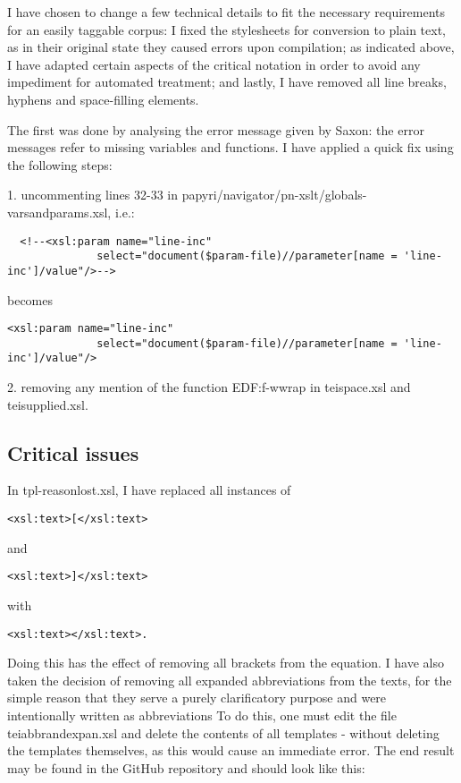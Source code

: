I have chosen to change a few technical details to fit the necessary
requirements for an easily taggable corpus: I fixed the stylesheets for
conversion to plain text, as in their original state they caused errors upon
compilation; as indicated above, I have adapted certain aspects of the critical
notation in order to avoid any impediment for automated treatment; and lastly,
I have removed all line breaks, hyphens and space-filling elements.

The first was done by analysing the error message given by Saxon: the
error messages refer to missing variables and functions. I have applied
a quick fix using the following steps:

1. uncommenting lines 32-33 in papyri/navigator/pn-xslt/globals-varsandparams.xsl, i.e.:

\begin{lstlisting}
  <!--<xsl:param name="line-inc"
              select="document($param-file)//parameter[name = 'line-inc']/value"/>-->
\end{lstlisting}
becomes
\begin{lstlisting}
<xsl:param name="line-inc"
              select="document($param-file)//parameter[name = 'line-inc']/value"/>
\end{lstlisting}

2. removing any mention of the function EDF:f-wwrap in teispace.xsl and
teisupplied.xsl.

\subsection{Critical issues}
\label{subsect:criticalissues}


In tpl-reasonlost.xsl, I have replaced all instances of
\begin{lstlisting}
<xsl:text>[</xsl:text> 
\end{lstlisting}
and 
\begin{lstlisting}
<xsl:text>]</xsl:text> 
\end{lstlisting}
with
\begin{lstlisting}
<xsl:text></xsl:text>.
\end{lstlisting}

Doing this has the effect of removing all brackets from the equation. I have
also taken the decision of removing all expanded abbreviations from the texts,
for the simple reason that they serve a purely clarificatory purpose and were
intentionally written as abbreviations  To do this, one must edit the file
teiabbrandexpan.xsl and delete the contents of all templates - without deleting
the templates themselves, as this would cause an immediate error. The end
result may be found in the GitHub repository and should look like this:

